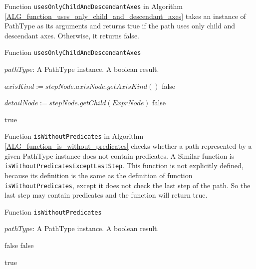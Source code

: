 Function \texttt{usesOnlyChildAndDescendantAxes} in Algorithm \ref{ALG_function_uses_only_child_and_descendant_axes} takes an instance of PathType as its arguments and returns true if the path uses only child and descendant axes. Otherwise, it returns false.

\begin{algorithm}
\caption{Function \texttt{usesOnlyChildAndDescendantAxes}}
\label{ALG_function_uses_only_child_and_descendant_axes}
\begin{algorithmic}[1]
\REQUIRE $pathType$: A PathType instance.
\ENSURE A boolean result.

		\STATE $axisKind := stepNode.axisNode.getAxisKind()$
			\RETURN false
		\ENDIF
	\ENDIF
\ENDFOR

\STATE $detailNode := stepNode.getChild(ExprNode)$
			\RETURN false
		\ENDIF
	\ENDIF
\ENDIF

\RETURN true
\end{algorithmic}
\end{algorithm}

Function \texttt{isWithoutPredicates} in Algorithm \ref{ALG_function_is_without_predicates} checks whether a path represented by a given PathType instance does not contain predicates. A Similar function is  \texttt{isWithoutPredicatesExceptLastStep}. This function is not explicitly defined, because its definition is the same as the definition of function \texttt{isWithoutPredicates}, except it does not check the last step of the path. So the last step may contain predicates and the function will return true.

\begin{algorithm}
\caption{Function \texttt{isWithoutPredicates}}
\label{ALG_function_is_without_predicates}
\begin{algorithmic}[1]
\REQUIRE $pathType$: A PathType instance.
\ENSURE A boolean result.

		\RETURN false
	\ENDIF
			\RETURN false
		\ENDIF
	\ENDIF
\ENDFOR

\RETURN true
\end{algorithmic}
\end{algorithm}

